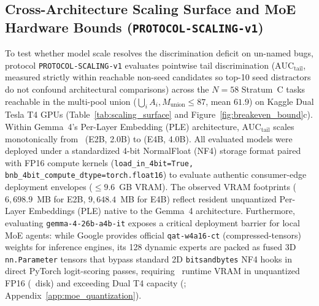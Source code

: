 \documentclass[10pt]{article}
\begin{document}
\subsection{Cross-Architecture Scaling Surface and MoE Hardware Bounds (\texttt{PROTOCOL-SCALING-v1})}
\label{sec:scaling_surface}
To test whether model scale resolves the discrimination deficit on un-named bugs, protocol \texttt{PROTOCOL-SCALING-v1} evaluates pointwise tail discrimination ($\text{AUC}_{\text{tail}}$, measured strictly within reachable non-seed candidates so top-10 seed distractors do not confound architectural comparisons) across the $N=58$ Stratum~C tasks reachable in the multi-pool union ($\bigcup_i A_i, M_{\text{union}} \le 87$, mean $61.9$) on Kaggle Dual Tesla T4 GPUs (Table~\ref{tab:scaling_surface} and Figure~\ref{fig:breakeven_bound}c). Within Gemma~4's Per-Layer Embedding (PLE) architecture, $\text{AUC}_{\text{tail}}$ scales monotonically from \ScalingGemmaETwoBAuc\ (E2B, 2.0B) to \textbf{\ScalingGemmaEFourBAuc} (E4B, 4.0B). All evaluated models were deployed under a standardized 4-bit NormalFloat (NF4) storage format paired with FP16 compute kernels (\texttt{load\_in\_4bit=True, bnb\_4bit\_compute\_dtype=torch.float16}) to evaluate authentic consumer-edge deployment envelopes ($\le 9.6$~GB VRAM). The observed VRAM footprints ($6,698.9$~MB for E2B, $9,648.4$~MB for E4B) reflect resident unquantized Per-Layer Embeddings (PLE) native to the Gemma~4 architecture. Furthermore, evaluating \texttt{gemma-4-26b-a4b-it} exposes a critical deployment barrier for local MoE agents: while Google provides official \texttt{qat-w4a16-ct} (compressed-tensors) weights for inference engines, its 128 dynamic experts are packed as fused 3D \texttt{nn.Parameter} tensors that bypass standard 2D \texttt{bitsandbytes} NF4 hooks in direct PyTorch logit-scoring passes, requiring \ScalingMoERuntimeVRAM\ runtime VRAM in unquantized FP16 (\ScalingMoERequiredVRAM\ disk) and exceeding Dual T4 capacity (\ScalingMoEAvailableVRAM; Appendix~\ref{app:moe_quantization}).
\end{document}
